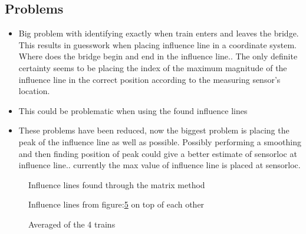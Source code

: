 \subsection{Problems}
\begin{itemize}
\item Big problem with identifying exactly when train enters and leaves the bridge. This results in guesswork when placing influence line in a coordinate system. Where does the bridge begin and end in the influence line.. The only definite certainty seems to be placing the index of the maximum magnitude of the influence line in the correct position according to the measuring sensor's location.
\item This could be problematic when using the found influence lines 
\item These problems have been reduced, now the biggest problem is placing the peak of the influence line as well as possible. Possibly performing a smoothing and then finding position of peak could give a better estimate of sensorloc at influence line.. currently the max value of influence line is placed at sensorloc.
\end{itemize}
\begin{figure}[H]
\centering
\begin{subfigure}[t]{0.45\textwidth}
	\centering
	
	\label{fig:train3}
\end{subfigure}
\qquad
\begin{subfigure}[t]{0.45\textwidth}
	\centering
		
	\label{fig:train4}
\end{subfigure}

\begin{subfigure}[t]{0.45\textwidth}
	\centering
	
	\label{fig:train5}
\end{subfigure}
\qquad
\begin{subfigure}[t]{0.45\textwidth}
	\centering
		
	\label{fig:train8}
\end{subfigure}
\caption{Influence lines found through the matrix method}\label{fig:infl_trains}
\end{figure}

\begin{figure}[H]
\centering

\caption{Influence lines from figure:\ref{fig:infl_trains} on top of each other}\label{fig:infl_all_trains}
\end{figure}

\begin{figure}[H]
\centering

\caption{Averaged of the 4 trains
}\label{fig:infl_averaged}
\end{figure}
